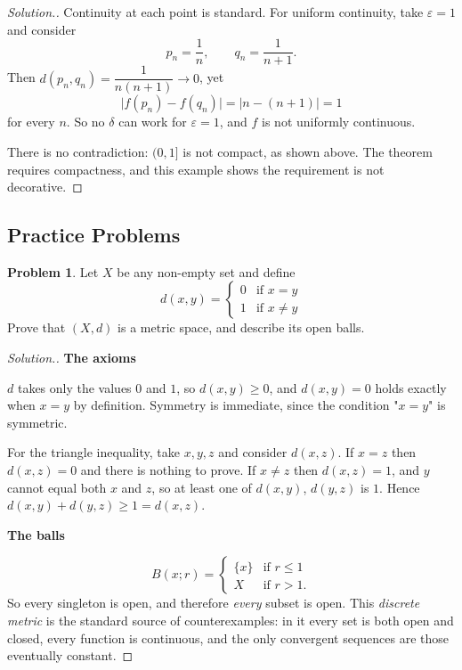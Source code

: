 \documentclass[11pt,a4paper]{article}
\theoremstyle{definition}
\newtheorem{problemx}{Problem}[section]
\newenvironment{problem}{\begin{problemx}}{\end{problemx}}
\newenvironment{solution}
  {\renewcommand{\qedsymbol}{}\begin{proof}[\textit{Solution}.]}
  {\end{proof}}
\newcommand{\subhead}[1]{%
  \par\medskip\noindent\textbf{#1}\par\nobreak\smallskip}
\begin{document}
\begin{solution}
Continuity at each point is standard. For uniform continuity, take
$\varepsilon=1$ and consider
$$p_n = \frac1n,\qquad q_n = \frac{1}{n+1} .$$
Then $d(p_n,q_n)=\dfrac{1}{n(n+1)}\rightarrow 0$, yet
$$\big|f(p_n)-f(q_n)\big| = \big|n-(n+1)\big| = 1$$
for every $n$. So no $\delta$ can work for $\varepsilon=1$, and $f$ is not
uniformly continuous.

There is no contradiction: $(0,1]$ is not compact, as shown above. The theorem
requires compactness, and this example shows the requirement is not decorative.
\end{solution}




\subsection{Practice Problems}

\begin{problem}
Let $X$ be any non-empty set and define
$$d(x,y)=\begin{cases}0 & \text{if } x=y\\ 1 & \text{if } x\neq y\end{cases}$$
Prove that $(X,d)$ is a metric space, and describe its open balls.
\end{problem}
\begin{solution}
\subhead{The axioms}
$d$ takes only the values $0$ and $1$, so $d(x,y)\geq 0$, and $d(x,y)=0$ holds
exactly when $x=y$ by definition. Symmetry is immediate, since the condition
"$x=y$" is symmetric.

For the triangle inequality, take $x,y,z$ and consider $d(x,z)$. If $x=z$ then
$d(x,z)=0$ and there is nothing to prove. If $x\neq z$ then $d(x,z)=1$, and $y$
cannot equal both $x$ and $z$, so at least one of $d(x,y)$, $d(y,z)$ is $1$.
Hence $d(x,y)+d(y,z)\geq 1=d(x,z)$.

\subhead{The balls}
$$B(x;r)=\begin{cases}\{x\} & \text{if } r\leq 1\\ X & \text{if } r>1 .\end{cases}$$
So every singleton is open, and therefore \emph{every} subset is open. This
\emph{discrete metric} is the standard source of counterexamples: in it every
set is both open and closed, every function is continuous, and the only
convergent sequences are those eventually constant.
\end{solution}
\end{document}
